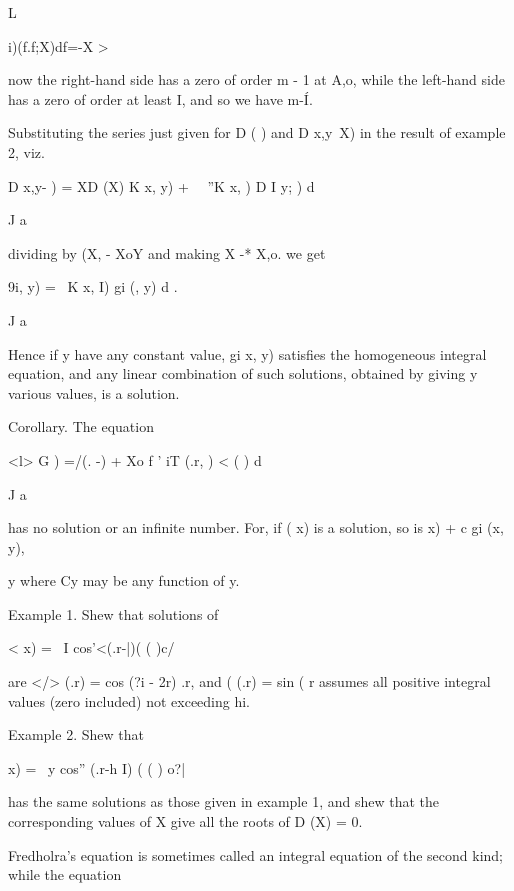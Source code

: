 L

i)(f.f;X)df=-X >

now the right-hand side has a zero of order m - 1 at A,o, while the
left-hand side has a zero of order at least I, and so we have m-\' I.

Substituting the series just given for D ( ) and D x,y\ X) in the
result of example 2, viz.

D x,y- ) = XD (X) K x, y) + \ \ ''K x, ) D I y; ) d

J a

dividing by (X, - XoY and making X -* X,o. we get

9i, y) = \ K x, I) gi (, y) d .

J a

Hence if y have any constant value, gi x, y) satisfies the homogeneous
integral equation, and any linear combination of such solutions,
obtained by giving y various values, is a solution.

Corollary. The equation

<l> G ) =/(. -) + Xo f ' iT (.r, ) < ( ) d

J a

has no solution or an infinite number. For, if ( x) is a solution, so
is x) + c gi (x, y),

y where Cy may be any function of y.

Example 1. Shew that solutions of

< x) = \ I cos'<(.r-|)( ( )c/

are </> (.r) = cos (?i - 2r) .r, and ( (.r) = sin (%
r assumes all positive integral values (zero included) not exceeding
hi.

Example 2. Shew that

  x) = \ y cos'' (.r-h I) ( ( ) o?|

has the same solutions as those given in example 1, and shew that the
corresponding values of X give all the roots of D (X) = 0.

%
%

Fredholra's
equation is sometimes called an integral equation of the second kind;
while the equation

